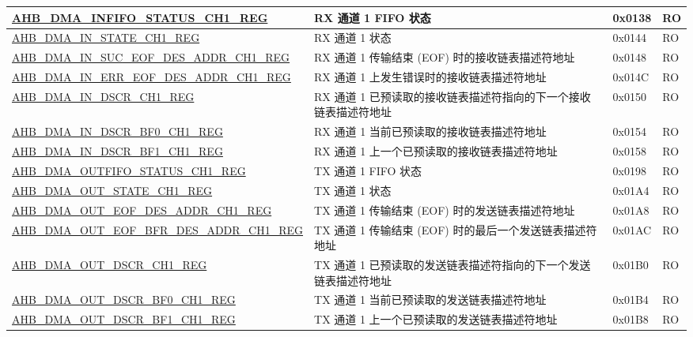 \begin{longtable}{ | p{8cm} | p{8cm} | p{1.3cm} | p{1.5cm} | }
\hyperref[regdesc:AHBDMAINFIFOSTATUSCHNREG]{AHB\_DMA\_INFIFO\_STATUS\_CH1\_REG} & RX 通道 1 FIFO 状态 & 0x0138 & RO \\ \hline
\hyperref[regdesc:AHBDMAINSTATECHNREG]{AHB\_DMA\_IN\_STATE\_CH1\_REG} & RX 通道 1 状态 & 0x0144 & RO \\ \hline
\hyperref[regdesc:AHBDMAINSUCEOFDESADDRCHNREG]{AHB\_DMA\_IN\_SUC\_EOF\_DES\_ADDR\_CH1\_REG} & RX 通道 1 传输结束 (EOF) 时的接收链表描述符地址 & 0x0148 & RO \\ \hline
\hyperref[regdesc:AHBDMAINERREOFDESADDRCHNREG]{AHB\_DMA\_IN\_ERR\_EOF\_DES\_ADDR\_CH1\_REG} & RX 通道 1 上发生错误时的接收链表描述符地址 & 0x014C & RO \\ \hline
\hyperref[regdesc:AHBDMAINDSCRCHNREG]{AHB\_DMA\_IN\_DSCR\_CH1\_REG} & RX 通道 1 已预读取的接收链表描述符指向的下一个接收链表描述符地址 & 0x0150 & RO \\ \hline
\hyperref[regdesc:AHBDMAINDSCRBF0CHNREG]{AHB\_DMA\_IN\_DSCR\_BF0\_CH1\_REG} & RX 通道 1 当前已预读取的接收链表描述符地址 & 0x0154 & RO \\ \hline
\hyperref[regdesc:AHBDMAINDSCRBF1CHNREG]{AHB\_DMA\_IN\_DSCR\_BF1\_CH1\_REG} & RX 通道 1 上一个已预读取的接收链表描述符地址 & 0x0158 & RO \\ \hline
\hyperref[regdesc:AHBDMAOUTFIFOSTATUSCHNREG]{AHB\_DMA\_OUTFIFO\_STATUS\_CH1\_REG} & TX 通道 1 FIFO 状态 & 0x0198 & RO \\ \hline
\hyperref[regdesc:AHBDMAOUTSTATECHNREG]{AHB\_DMA\_OUT\_STATE\_CH1\_REG} & TX 通道 1 状态 & 0x01A4 & RO \\ \hline
\hyperref[regdesc:AHBDMAOUTEOFDESADDRCHNREG]{AHB\_DMA\_OUT\_EOF\_DES\_ADDR\_CH1\_REG} & TX 通道 1 传输结束 (EOF) 时的发送链表描述符地址 & 0x01A8 & RO \\ \hline
\hyperref[regdesc:AHBDMAOUTEOFBFRDESADDRCHNREG]{AHB\_DMA\_OUT\_EOF\_BFR\_DES\_ADDR\_CH1\_REG} & TX 通道 1 传输结束 (EOF) 时的最后一个发送链表描述符地址 & 0x01AC & RO \\ \hline
\hyperref[regdesc:AHBDMAOUTDSCRCHNREG]{AHB\_DMA\_OUT\_DSCR\_CH1\_REG} & TX 通道 1 已预读取的发送链表描述符指向的下一个发送链表描述符地址 & 0x01B0 & RO \\ \hline
\hyperref[regdesc:AHBDMAOUTDSCRBF0CHNREG]{AHB\_DMA\_OUT\_DSCR\_BF0\_CH1\_REG} & TX 通道 1 当前已预读取的发送链表描述符地址 & 0x01B4 & RO \\ \hline
\hyperref[regdesc:AHBDMAOUTDSCRBF1CHNREG]{AHB\_DMA\_OUT\_DSCR\_BF1\_CH1\_REG} & TX 通道 1 上一个已预读取的发送链表描述符地址 & 0x01B8 & RO \\ \hline

\end{longtable}
